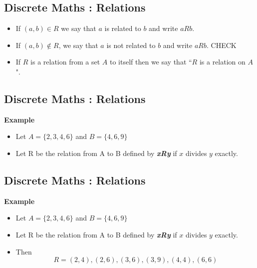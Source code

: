 \documentclass[]{report}
\begin{document}

\subsection{Discrete Maths : Relations}

\begin{itemize}

\item  If $(a, b) \in R$ we say that $a$ is related to $b$ and write $aRb$.
\item If $(a, b) \notin R$, we say that $a$ is not related to $b$ and write $aRb$. CHECK
\item If
$R$ is a relation from a set $A$ to itself then we say that ``$R$ is a relation
on $A$".
\end{itemize}


\subsection{Discrete Maths : Relations}

\textbf{Example}
\begin{itemize}
\item Let $A = \{2, 3, 4, 6\}$ and $B = \{4, 6, 9\}$
\item Let R be the relation from A to B defined by \textit{\textbf{xRy}} if $x$
divides $y$ exactly.
\end{itemize}



\subsection{Discrete Maths : Relations}

\textbf{Example}
\begin{itemize}

\item Let $A = \{2, 3, 4, 6\}$ and $B = \{4, 6, 9\}$
\item Let R be the relation from A to B defined by \textit{\textbf{xRy}} if $x$
divides $y$ exactly.
\item  Then
\[R = {(2, 4), (2, 6), (3, 6), (3, 9), (4, 4), (6, 6)}\]
\end{itemize}
\end{document}
